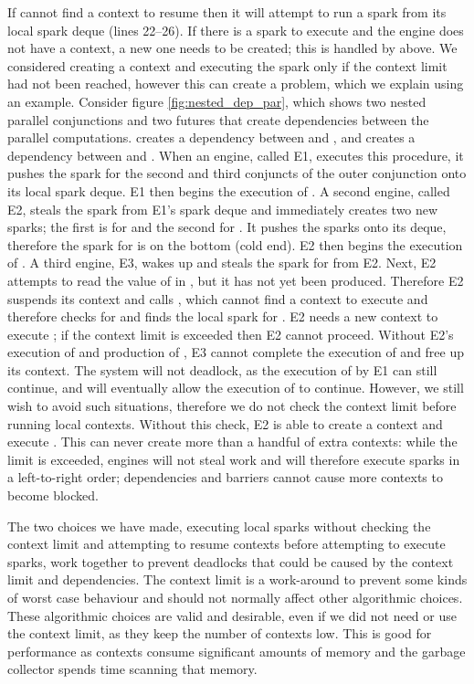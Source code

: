 If \idle cannot find a context to resume then it
will attempt to run a spark from its local spark deque (lines 22--26).
If there is a spark to execute and the engine does not have a context,
a new one needs to be created;
this is handled by \prepareengineforspark above.
We considered creating a context and executing the spark only if the
context limit had not been reached,
however this can create a problem, which we explain using an example.
Consider figure \ref{fig:nested_dep_par},
which shows two nested parallel conjunctions and
two futures that create dependencies between the parallel
computations.
 creates a dependency between  and ,
and  creates a dependency between  and .
When an engine, called E1,
executes this procedure,
it pushes the spark for the second and third
conjuncts of the outer conjunction onto its local spark deque.
E1 then begins the execution of .
A second engine, called E2,
steals the spark from E1's spark deque and immediately creates two new
sparks; the first is for  and the second for .
It pushes the sparks onto its deque,
therefore the spark for  is on the bottom (cold end).
E2 then begins the execution of .
A third engine, E3,
wakes up and steals the spark for  from E2.
Next,
E2 attempts to read the value of  in ,
but it has not yet been produced.
Therefore E2 suspends its context and calls \idle, which cannot find a context
to execute and therefore checks for and finds the local spark for .
E2 needs a new context to execute ;
if the context limit is exceeded then E2 cannot proceed.
Without E2's execution of  and production of ,
E3 cannot complete the execution of  and free up its context.
The system will not deadlock, as the execution of  by E1 can still
continue, and will eventually allow the execution of  to continue.
However, we still wish to avoid such situations,
therefore we do not check the context limit before running local contexts.
Without this check,
E2 is able to create a context and execute .
This can never create more than a handful of extra contexts:
while the limit is exceeded,
engines will not steal work and will therefore execute sparks in a
left-to-right order;
dependencies and barriers cannot cause more contexts to become blocked.

The two choices we have made,
executing local sparks without checking the context limit and
attempting to resume contexts before attempting to execute sparks,
work together to prevent deadlocks that could be caused by
the context limit and dependencies.
The context limit is a work-around to prevent some kinds of worst case
behaviour and should not normally affect other algorithmic choices.
These algorithmic choices are valid and desirable,
even if we did not need or use the context limit,
as they keep the number of contexts low.
This is good for performance as contexts consume significant amounts of
memory and the garbage collector spends time scanning that memory.

